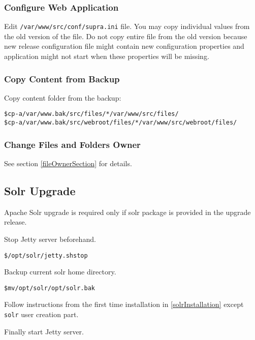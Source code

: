 \documentclass[12pt]{article}
\newcommand{\vigPathToProject}{/var/www}
\newcommand{\vigPathToSrc}{/src}
\begin{document}
\subsubsection{Configure Web Application}
Edit \texttt{\vigPathToProject\vigPathToSrc/conf/supra.ini} file. You may copy individual values from the old version of the file. Do not copy entire file from the old version because new release configuration file might contain new configuration properties and application might not start when these properties will be missing.

\subsubsection{Copy Content from Backup}
Copy content folder from the backup:

\begin{alltt}
\$ cp -a \vigPathToProject.bak\vigPathToSrc/files/* \vigPathToProject\vigPathToSrc/files/
\$ cp -a \vigPathToProject.bak\vigPathToSrc/webroot/files/* \vigPathToProject\vigPathToSrc/webroot/files/
\end{alltt}

\subsubsection{Change Files and Folders Owner}

See section \ref{fileOwnerSection} for details.

\subsection{Solr Upgrade}

Apache Solr upgrade is required only if solr package is provided in the upgrade release.

Stop Jetty server beforehand.

\begin{alltt}
\$ /opt/solr/jetty.sh stop
\end{alltt}

Backup current solr home directory.

\begin{alltt}
\$ mv /opt/solr /opt/solr.bak
\end{alltt}

Follow instructions from the first time installation in \ref{solrInstallation} except \texttt{solr} user creation part.

Finally start Jetty server.
\end{document}
